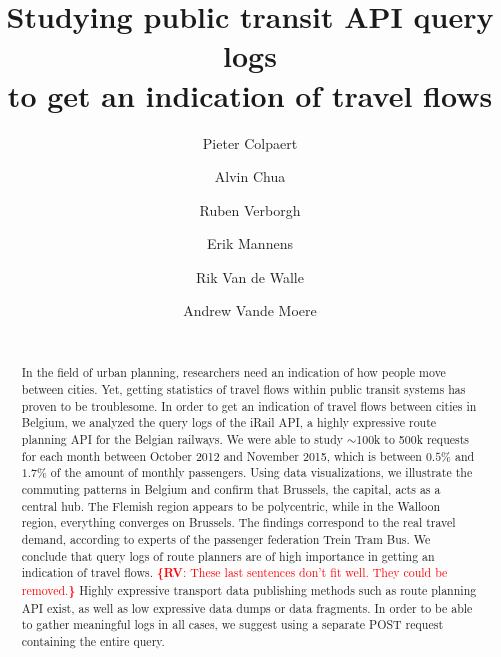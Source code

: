 \documentclass{sig-alternate}
\newcommand{\rv}[1]{\noindent\textcolor{red}{{\bf \{RV}: #1{\bf \}}}}
\begin{document}
\title{Studying public transit API query logs\\ to get an indication of travel flows}
\author{
\alignauthor
Pieter Colpaert\\
\and
\alignauthor
Alvin Chua\\
\and
\alignauthor
Ruben Verborgh\\
\and
\alignauthor
Erik Mannens\\
\and
\alignauthor
Rik Van de Walle\\
\and
\alignauthor
Andrew Vande Moere\\
\\
}

\maketitle
\begin{abstract}

In the field of urban planning, researchers need an indication of how people move between cities. 
Yet, getting statistics of travel flows within public transit systems has proven to be troublesome.
In order to get an indication of travel flows between cities in Belgium,
we analyzed the query logs of the iRail API, a highly expressive route planning API for the Belgian railways.
We were able to study $\sim$100k to 500k requests for each month between October 2012 and November 2015, which is between $0.5\%$ and $1.7\%$ of the amount of monthly passengers.
Using data visualizations, we illustrate the commuting patterns in Belgium and confirm that Brussels, the capital, acts as a central hub. The Flemish region appears to be polycentric, while in the Walloon region, everything converges on Brussels.
The findings correspond to the real travel demand, according to experts of the passenger federation Trein Tram Bus.
We conclude that query logs of route planners are of high importance in getting an indication of travel flows.
\rv{These last sentences don't fit well. They could be removed.}
Highly expressive transport data publishing methods such as route planning API exist, as well as low expressive data dumps or data fragments.
In order to be able to gather meaningful logs in all cases, we suggest using a separate POST request containing the entire query.

\end{abstract}
\end{document}
